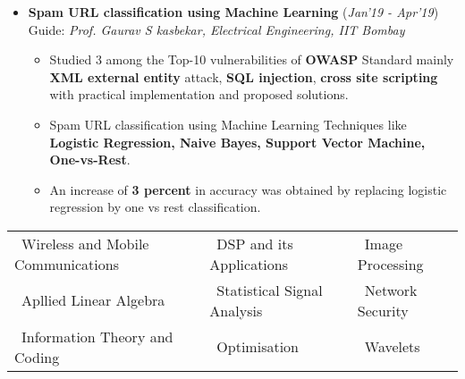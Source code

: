 \documentclass[10pt]{article}
\begin{document}
\begin{itemize}[leftmargin=0.4cm]
\begin{itemize}
	\end{itemize}\
	\vspace{-0.75cm}

\item \textbf{Spam URL classification using Machine Learning}
\hfill{(\textit{Jan'19 - Apr'19})}\\
Guide: \textit{Prof. Gaurav S kasbekar, Electrical Engineering, IIT Bombay}\\
\vspace{-0.7cm}
	\begin{itemize}
	\item Studied 3 among the Top-10 vulnerabilities of \textbf{OWASP} Standard mainly \textbf{XML external entity} attack, \textbf{SQL injection}, \textbf{cross site scripting} with practical implementation and proposed solutions.\vspace{-0.1cm}
	\item Spam URL classification using Machine Learning Techniques like \textbf{Logistic Regression, Naive Bayes, Support Vector Machine, One-vs-Rest}.
	\item An increase of \textbf{3 percent} in accuracy was obtained by replacing logistic regression by one vs rest classification.\vspace{-0.1cm}
    \end{itemize}

	\vspace{0.1cm}


\end{itemize}
\hspace{-0.17cm}\colorbox{bl}{}%
	\vspace{0.1cm} 


 	
		\begin{tabular}{ l l l }
		\hspace{0.55cm}\textbullet\ Wireless and Mobile Communications &  \textbullet\ DSP and its Applications & \textbullet\ Image Processing \\
		\hspace{0.55cm}\textbullet\ Apllied Linear Algebra & \textbullet\ Statistical Signal Analysis & \textbullet\ Network Security \\
		\hspace{0.55cm}\textbullet\ Information Theory and Coding & \textbullet\ Optimisation & \textbullet\ Wavelets\\
	\end{tabular}
	
\end{document}
